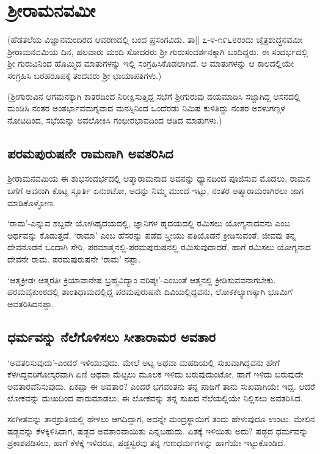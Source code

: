 \chapter{ಶ್ರೀರಾಮನವಮೀ} 

(ಹೆಡತಲೆಯ ವಿಜ್ಞಾನಮಂದಿರದ ಆವರಣದಲ್ಲಿ ಬಂದ ಪ್ರಸಂಗವಿದು. ತಾ|| ೭-೪-೧೯೬೮ರಂದು ಚೈತ್ರಶುದ್ಧನವಮೀ ಶ್ರೀರಾಮನವಮಿಯ ದಿನ, ಹಲವಾರು ಮಂದಿ ಸೋದರರು ಶ್ರೀ ಗುರುಸಂದರ್ಶನಕ್ಕಾಗಿ ಬಂದಿದ್ದರು. ಈ ಸಂದರ್ಭದಲ್ಲಿ ಶ್ರೀ ಗುರುವಿನಿಂದ ಹೊಮ್ಮಿದ ಮಾತುಗಳನ್ನು ಇಲ್ಲಿ ಸಂಗ್ರಹಿಸಿಕೊಡಲಾಗಿದೆ. ಆ ಮಾತುಗಳನ್ನು ಆ ಕಾಲದಲ್ಲಿಯೇ ಸಂಗ್ರಹಿಸಿ ಬರಹರೂಪಕ್ಕೆ ತಂದವರು ಶ್ರೀ ಛಾಯಾಪತಿಗಳು.) 

(ಶ್ರೀಗುರುವಿನ ಆಗಮನಕ್ಕಾಗಿ ಕಾತರದಿಂದ ನಿರೀಕ್ಷಿಸುತ್ತಿದ್ದ ಸಭೆಗೆ ಶ್ರೀಗುರುವು ದಯಮಾಡಿಸಿ ಸಜ್ಜಾಗಿದ್ದ ಆಸನದಲ್ಲಿ ಮಂಡಿಸಿ ನಂತರ ಅಂತರ್ಭಾವಮಗ್ನವಾದ ಮನಸ್ಸಿನಿಂದ ಒಂದೆರಡು ನಿಮಿಷ ಕುಳಿತಿದ್ದು ನಂತರ ಅರಳುಗಣ್ಗಳ ನೋಟದಿಂದ, ಸಭೆಯನ್ನು ಅವಲೋಕಿಸಿ ಗಂಭೀರಭಾವದಿಂದ ಆಡಿದ ಮಾತುಗಳು.) 

\section*{ಪರಮಪುರುಷನೇ ರಾಮನಾಗಿ ಅವತರಿಸಿದ}

ಶ್ರೀರಾಮನವಮಿಯ ಈ ಶುಭಸಂದರ್ಭದಲ್ಲಿ ಆತ್ಮಾರಾಮನಾದ ಅವನನ್ನು ಧ್ಯಾನದಿಂದ ಪೂಜಿಸುವ ಮೊದಲು, ರಾಮನ ಬಗೆಗೆ ಅವನಾಗಿ ಕೊಟ್ಟ ಸ್ಫೂರ್ತಿ ಏನುಂಟೋ, ಅದನ್ನು ನಿಮ್ಮ ಮುಂದೆ ಇಟ್ಟು, ನಂತರ ಆತ್ಮಾರಾಮರಾಗಿರಲು ಜಾಗ ಮಾಡಿಕೊಳ್ಳೋಣ. 

`ರಾಮ'-ಎನ್ನುವ ಶಬ್ದವೇ ಯೋಗಿಹೃದಯದಲ್ಲಿ, ಜ್ಞಾನಿಗಳ ಹೃದಯದಲ್ಲಿ ರಮಿಸಲು ಯೋಗ್ಯನಾದವನು ಎಂಬ ಅರ್ಥವನ್ನು ಕೊಡುತ್ತದೆ. `ರಾಮಾ' ಎಂಬ ಹೆಸರನ್ನು ಪಡೆದ ಸ್ತ್ರೀಯು ಪತಿಯೊಡನೆ ಕ್ರೀಡಿಸುವಂತೆ, ಜೀವವು ತನ್ನ ದೇವನೊಡನೆ ಒಂದಾಗಿ ಸೇರಿ, ಪರಮಾತ್ಮನಲ್ಲಿ-ಪರಮಪುರುಷನಲ್ಲಿ ರಮಿಸುವುದಾದರೆ, ಹಾಗೆ ರಮಿಸಲು ಯೋಗ್ಯನಾದ ದೇವನೇ ರಾಮ. ಪರಮಪುರುಷನೇ `ರಾಮ' ನಪ್ಪಾ. 

`ಆತ್ಮಕ್ರೀಡಃ ಆತ್ಮರತಿಃ ಕ್ರಿಯಾವಾನೇಷ ಬ್ರಹ್ಮವಿದ್ಯಾಂ ವರಿಷ್ಠಃ'-ಎಂಬಂತೆ ಆತ್ಮನಲ್ಲಿ ಕ್ರೀಡಿಸುವವನಾಗಬೇಕು. ಪರಮವೈಕುಂಠದಲ್ಲಿ ಶಾಂತಿಧಾಮದಲ್ಲಿದ್ದ ಪರಮಪುರುಷನೇ ದಿವಿಯಲ್ಲಿದ್ದವನು, ಲೋಕಕಲ್ಯಾಣಕ್ಕಾಗಿ ಭೂಮಿಗೆ ಅವತರಿಸಿದನಪ್ಪಾ. 

\section*{ಧರ್ಮವನ್ನು ನೆಲೆಗೊಳಿಸಲು ಸೀತಾರಾಮರ ಅವತಾರ}

`ಅವತರಿಸುವುದು'-ಎಂದರೆ ಇಳಿಯುವುದು. ಮೇಲೆ ಅಟ್ಟ ಅಥವಾ ಮಹಡಿಯಲ್ಲಿ ಸುಖವಾಗಿದ್ದವನು ಹೇಗೆ ಕೆಳಗಿದ್ದವರಿಗೋಸ್ಕರವಾಗಿ ಏಣಿ ಅಥವಾ ಮೆಟ್ಟಲು ಮೂಲಕ ಇಳಿದು ಬರುವುದುಂಟೋ, ಹಾಗೆ ಇಳಿದು ಬರುವುದೇ ಅವತಾರವೆನಿಸುವುದು. ಏಕಪ್ಪಾ ಈ ಅವತಾರ? ಎಂದರೆ ಭಗವಂತನು ತನ್ನ ಪಾಡಿಗೆ ತಾನು ಸುಖವಾಗಿಯೇ ಇದ್ದ. ಆದರೆ ಲೋಕವನ್ನು ದುಃಖದಿಂದ ಪಾರುಮಾಡಲು, ಈ ಲೋಕವನ್ನು ತನ್ನ ಸುಖದ ನೆಲೆಯಲ್ಲಿಯೇ ನಿಲ್ಲಿಸಲು ಅವತರಿಸಿದ. 

ಸಂಗೀತವನ್ನು ತಾರಶ್ರುತಿಯಲ್ಲಿ ಹೇಳಲು ಆಗದಿದ್ದಾಗ, ಅದನ್ನೇ ಮಂದ್ರಸ್ಥಾಯಿಗೆ ತಂದು ಹೇಳುವುದೂ ಉಂಟು. ಮೇಲಿನ ಷಡ್ಜವನ್ನು ಕೆಳಕ್ಕಿಳಿಸಿದಾಗ, ಷಡ್ಜದ ಅವತಾರವಾಯಿತು ಎನ್ನಬಹುದು. ಏತಕ್ಕೆ ಇಳಿಯಿತು ಅದು? ಷಡ್ಜದ ಧರ್ಮವನ್ನು ಪ್ರಕಾಶಪಡಿಸಲು, ಹಾಗೆ ಕೆಳಕ್ಕೆ ಇಳಿದರೂ, ಷಡ್ಜಸ್ವರವು ತನ್ನ ಗುಣಧರ್ಮಗಳನ್ನು ಹಾಗೆಯೇ ಇಟ್ಟುಕೊಂಡಿದೆ. 


